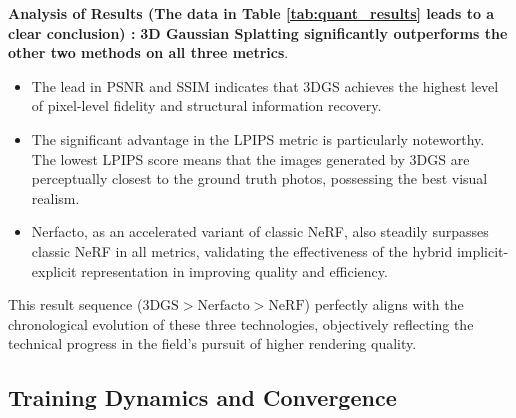 \documentclass[11pt]{article}
\begin{document}
\textbf{Analysis of Results (The data in Table \ref{tab:quant_results} leads to a clear conclusion) :} \textbf{3D Gaussian Splatting significantly outperforms the other two methods on all three metrics}.
\begin{itemize}
    \item The lead in PSNR and SSIM indicates that 3DGS achieves the highest level of pixel-level fidelity and structural information recovery.
    \item The significant advantage in the LPIPS metric is particularly noteworthy. The lowest LPIPS score means that the images generated by 3DGS are perceptually closest to the ground truth photos, possessing the best visual realism.
    \item Nerfacto, as an accelerated variant of classic NeRF, also steadily surpasses classic NeRF in all metrics, validating the effectiveness of the hybrid implicit-explicit representation in improving quality and efficiency.
\end{itemize}
This result sequence ($\text{3DGS} > \text{Nerfacto} > \text{NeRF}$) perfectly aligns with the chronological evolution of these three technologies, objectively reflecting the technical progress in the field's pursuit of higher rendering quality.

\subsection{Training Dynamics and Convergence}
\end{document}

